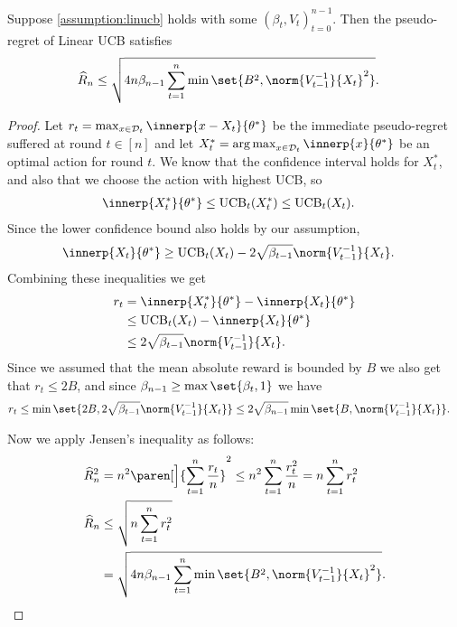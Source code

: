 \documentclass{article}
\newcommand{\inv}[1]{#1^{-1}}
\newcommand{\UCB}{\operatorname{UCB}}
\DeclareMathOperator*{\argmax}{arg\,max}
\DeclarePairedDelimiter{\paren}()
\newcommand{\Dset}[1]{\mathcal{D}_{#1}}
\begin{document}
\begin{lemma}\label{lemma:linucb-regret}
  Suppose \cref{assumption:linucb} holds with some
  ${(\beta_t, V_t)}_{t=0}^{n-1}$.  Then the pseudo-regret of Linear
  UCB satisfies
  \begin{align*}
    \widehat{R}_n &\le \sqrt{4n\beta_{n-1} \sum_{t=1}^n\min\set{B^2, \norm{\inv{V_{t-1}}}{X_t}^2}}.
  \end{align*}

  \begin{proof}
    Let $r_t = \max_{x\in\Dset{t}} \innerp{x-X_t}{\theta^*}$ be the
    immediate pseudo-regret suffered at round $t\in[n]$ and let
    $X_t^* = \argmax_{x\in\Dset{t}}\innerp{x}{\theta^*}$ be an optimal
    action for round $t$.  We know that the confidence interval holds
    for $X_t^*$, and also that we choose the action with highest UCB,
    so
    \begin{align*}
      \innerp{X_t^*}{\theta^*} &\le \UCB_t(X_t^*) \le \UCB_t(X_t).
    \end{align*}
    Since the lower confidence bound also holds by our assumption,
    \begin{align*}
      \innerp{X_t}{\theta^*} &\ge \UCB_t(X_t) - 2\sqrt{\beta_{t-1}}\norm{\inv{V_{t-1}}}{X_t}.
    \end{align*}
    Combining these inequalities we get
    \begin{align*}
      r_t &= \innerp{X_t^*}{\theta^*} - \innerp{X_t}{\theta^*} \\
         &\le \UCB_t(X_t) - \innerp{X_t}{\theta^*} \\
         &\le 2\sqrt{\beta_{t-1}}\norm{\inv{V_{t-1}}}{X_t}.
    \end{align*}
    Since we assumed that the mean absolute reward is bounded by $B$
    we also get that $r_t \le 2B$, and since $\beta_{n-1} \ge \max\set{\beta_t, 1}$
    we have
    \begin{align*}
      r_t &\le \min\set{2B, 2\sqrt{\beta_{t-1}}\norm{\inv{V_{t-1}}}{X_t}}
           \le 2\sqrt{\beta_{n-1}} \min\set{B, \norm{\inv{V_{t-1}}}{X_t}}.
    \end{align*}

    Now we apply Jensen's inequality as follows:
    \begin{align*}
      \widehat{R}_n^2 &= n^2 \paren[\Big]{\sum_{t=1}^n \frac{r_t}{n}}^2
                      \le n^2 \sum_{t=1}^n \frac{r_t^2}{n} = n\sum_{t=1}^nr_t^2 \\
      \widehat{R}_n &\le \sqrt{n\sum_{t=1}^n r_t^2} \\
                    &= \sqrt{4n\beta_{n-1} \sum_{t=1}^n\min\set{B^2, \norm{\inv{V_{t-1}}}{X_t}^2}}.
                      \qedhere
    \end{align*}
  \end{proof}
\end{lemma}
\end{document}

